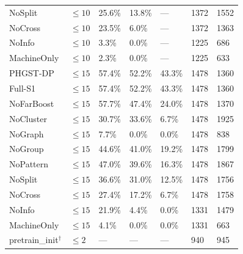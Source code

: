 \begin{table}[p]
\begin{tabularx}{\textwidth}{@{}lXXXXXX@{}}
NoSplit & $\le 10$ & 25.6\% & 13.8\% & --- & 1372 & 1552 \\
NoCross & $\le 10$ & 23.5\% & 6.0\% & --- & 1372 & 1363 \\
NoInfo & $\le 10$ & 3.3\% & 0.0\% & --- & 1225 & 686 \\
MachineOnly & $\le 10$ & 2.3\% & 0.0\% & --- & 1225 & 633 \\
\midrule
PHGST-DP & $\le 15$ & 57.4\% & 52.2\% & 43.3\% & 1478 & 1360 \\
Full-S1 & $\le 15$ & 57.4\% & 52.2\% & 43.3\% & 1478 & 1360 \\
NoFarBoost & $\le 15$ & 57.7\% & 47.4\% & 24.0\% & 1478 & 1370 \\
NoCluster & $\le 15$ & 30.7\% & 33.6\% & 6.7\% & 1478 & 1925 \\
NoGraph & $\le 15$ & 7.7\% & 0.0\% & 0.0\% & 1478 & 838 \\
NoGroup & $\le 15$ & 44.6\% & 41.0\% & 19.2\% & 1478 & 1799 \\
NoPattern & $\le 15$ & 47.0\% & 39.6\% & 16.3\% & 1478 & 1867 \\
NoSplit & $\le 15$ & 36.6\% & 31.0\% & 12.5\% & 1478 & 1756 \\
NoCross & $\le 15$ & 27.4\% & 17.2\% & 6.7\% & 1478 & 1758 \\
NoInfo & $\le 15$ & 21.9\% & 4.4\% & 0.0\% & 1331 & 1479 \\
MachineOnly & $\le 15$ & 4.1\% & 0.0\% & 0.0\% & 1331 & 663 \\
\midrule
pretrain\_init$^\dagger$ & $\le 2$ & --- & --- & --- & 940 & 945 \\
\bottomrule
\end{tabularx}
\end{table}

